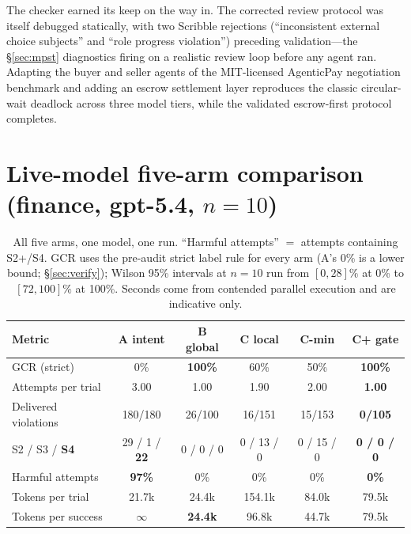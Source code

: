 \documentclass{article}
\begin{document}
The checker earned its keep on the way in. The corrected review protocol was itself debugged statically, with two Scribble rejections (``inconsistent external choice subjects'' and ``role progress violation'') preceding validation---the \S\ref{sec:mpst} diagnostics firing on a realistic review loop before any agent ran. Adapting the buyer and seller agents of the MIT-licensed AgenticPay negotiation benchmark \citep{agenticpay} and adding an escrow settlement layer reproduces the classic circular-wait deadlock across three model tiers, while the validated escrow-first protocol completes.

\section{Live-model five-arm comparison (finance, gpt-5.4, $n{=}10$)}\label{app:grand}
\begin{table}[h]
\centering\small
\caption{All five arms, one model, one run. ``Harmful attempts'' $=$ attempts containing S2+/S4. GCR uses the pre-audit strict label rule for every arm (A's 0\% is a lower bound; \S\ref{sec:verify}); Wilson 95\% intervals at $n{=}10$ run from $[0,28]\%$ at 0\% to $[72,100]\%$ at 100\%. Seconds come from contended parallel execution and are indicative only.}
\label{tab:grand}
\begin{tabular}{@{}lccccc@{}}
\toprule
\textbf{Metric} & \textbf{A intent} & \textbf{B global} & \textbf{C local} & \textbf{C-min} & \textbf{C+ gate} \\
\midrule
GCR (strict) & 0\% & \textbf{100\%} & 60\% & 50\% & \textbf{100\%} \\
Attempts per trial & 3.00 & 1.00 & 1.90 & 2.00 & \textbf{1.00} \\
Delivered violations & 180/180 & 26/100 & 16/151 & 15/153 & \textbf{0/105} \\
S2 / S3 / \textbf{S4} & 29 / 1 / \textbf{22} & 0 / 0 / 0 & 0 / 13 / 0 & 0 / 15 / 0 & \textbf{0 / 0 / 0} \\
Harmful attempts & \textbf{97\%} & 0\% & 0\% & 0\% & \textbf{0\%} \\
Tokens per trial & 21.7k & 24.4k & 154.1k & 84.0k & 79.5k \\
Tokens per success & $\infty$ & \textbf{24.4k} & 96.8k & 44.7k & 79.5k \\
\bottomrule
\end{tabular}
\end{table}
\end{document}
